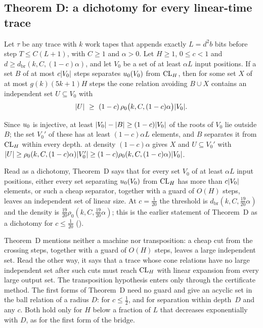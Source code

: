 \subsection{Theorem D: a dichotomy for every linear-time trace}

\begin{theorem}[Theorem~D]\label{thm:D}
Let $\tau$ be any trace with $k$ work tapes that appends exactly $L=d^2b$ bits before step $T\le C(L+1)$, with $C\ge1$ and
$\alpha>0$. Let $H\ge1$, $0\le c<1$ and $d\ge d_{\mathrm{br}}(k,C,(1-c)\alpha)$, and let $V_0$ be a set of at least $\alpha L$ input
positions. If a set $B$ of at most $c\lvert V_0 \rvert$ steps separates $u_0(V_0)$ from $\mathrm{CL}_H$, then for some set $X$ of at most
$g(k)(5k+1)H$ steps the cone relation avoiding $B\cup X$ contains an independent set $U\subseteq V_0$ with
\[
  \abs U\ \ge\ (1-c)\,\rho_0\bigl(k,C,(1-c)\alpha\bigr)\abs{V_0}.
\]
\end{theorem}

\begin{outline}
Since $u_0$ is injective, at least $\lvert V_0 \rvert-\lvert B \rvert\ge(1-c)\lvert V_0 \rvert$ of the roots of $V_0$ lie outside $B$; the set $V_0'$ of these
has at least $(1-c)\alpha L$ elements, and $B$ separates it from $\mathrm{CL}_H$ within every depth.  at density $(1-c)\alpha$
gives $X$ and $U\subseteq V_0'$ with $\lvert U \rvert\ge\rho_0(k,C,(1-c)\alpha)\lvert V_0' \rvert\ge(1-c)\rho_0(k,C,(1-c)\alpha)\lvert V_0 \rvert$.
\end{outline}

Read as a dichotomy, Theorem~D says that for every set $V_0$ of at least $\alpha L$ input positions, either every set separating
$u_0(V_0)$ from $\mathrm{CL}_H$ has more than $c\lvert V_0 \rvert$ elements, or such a cheap separator, together with a guard of $O(H)$ steps, leaves
an independent set of linear size. At $c=\frac1{20}$ the threshold is $d_{\mathrm{br}}(k,C,\frac{19}{20}\alpha)$ and the density is
$\frac{19}{20}\rho_0(k,C,\frac{19}{20}\alpha)$; this is the earlier statement of Theorem~D as a dichotomy for $c\le\frac1{20}$
().

Theorem~D mentions neither a machine nor transposition: a cheap cut from the crossing steps, together with a guard of $O(H)$ steps,
leaves a large independent set. Read the other way, it says that a trace whose cone relations have no large independent set after such cuts must reach $\mathrm{CL}_H$ with linear expansion from
every large output set. The transposition hypothesis enters only through the certificate method. The first forms of Theorem~D need no guard and give an acyclic set in the ball relation of a radius $D$:
 for $c\le\frac12$, and 
for separation within depth~$D$ and any $c$. Both hold only for $H$ below a fraction of $L$ that decreases exponentially with $D$, as
for the first form of the bridge.

